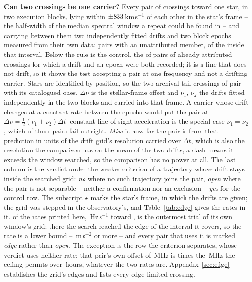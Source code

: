 \begin{table}
\centering
\caption{\textbf{Can two crossings be one carrier?} Every pair of crossings
toward one star, in two execution blocks, lying within
$\pm\WdHalfKms$\,km\,s$^{-1}$ of each other in the star's frame -- the
half-width of the median spectral window a repeat could be found in -- and
carrying between them two independently fitted drifts and two block epochs
measured from their own data: \TjNPair{} pairs with an unattributed member,
of the \TjNCandPair{} inside that interval. Below the rule is the control, the
\TjNCandAttrTest{} of \TjNCandAttr{} pairs of already attributed crossings for
which a drift and an epoch were both recorded; it is a line that does not
drift, so it shows the test accepting a pair at one frequency and not a
drifting carrier. Stars are
identified by position, so the two archival-tail crossings of \TjDeepStar{}
pair with its catalogued ones. $\Delta\nu$ is the stellar-frame offset and
$\dot\nu_1$, $\dot\nu_2$ the drifts fitted independently in the two blocks
and carried into that frame. A carrier whose drift changes at a constant rate
between the epochs would put the pair at
$\Delta\nu=\frac{1}{2}(\dot\nu_1+\dot\nu_2)\Delta t$; constant
line-of-sight acceleration is the special case $\dot\nu_1=\dot\nu_2$, which
\TjNUneqDrift{} of these pairs fail outright. \emph{Miss} is how
far the pair is from that prediction in units of the drift grid's resolution
carried over $\Delta t$, which is also the resolution the comparison has on
the mean of the two drifts; a dash means it exceeds the window searched, so the
comparison has no power at all. The last column is the verdict under the weaker
criterion of a trajectory whose drift stays inside the searched grid:
\emph{no} where no such trajectory joins the pair, \emph{open} where the pair
is not separable -- neither a confirmation nor an exclusion --
\emph{yes} for the control row. The subscript $\star$ marks the star's
frame, in which the drifts are given; the grid was stepped in the
observatory's, and Table~\ref{tab:edge} gives the rates in it. \EgNPairDriftEdge{} of the rates
printed here, \EgStarDriftHzS\,Hz\,s$^{-1}$ toward \EgStarALosHiStar, is the
outermost trial of its own window's grid: there the search reached the edge
of the interval it covers, so the rate is a lower bound --
\EgStarALosHi\,m\,s$^{-2}$ or more -- and every pair that uses it is marked
\emph{edge} rather than \emph{open}. The exception is the row the criterion
separates, whose verdict uses neither rate: that pair's own offset of
\EgExclOffMHz\,MHz is \EgExclFac{} times the \EgExclReachMHz\,MHz the
ceiling permits over \EgExclDtH\,hours, whatever the two rates are.
Appendix~\ref{sec:edge} establishes the grid's edges and lists every
edge-limited crossing.}
\label{tab:pairs}
\scriptsize

\end{table}

